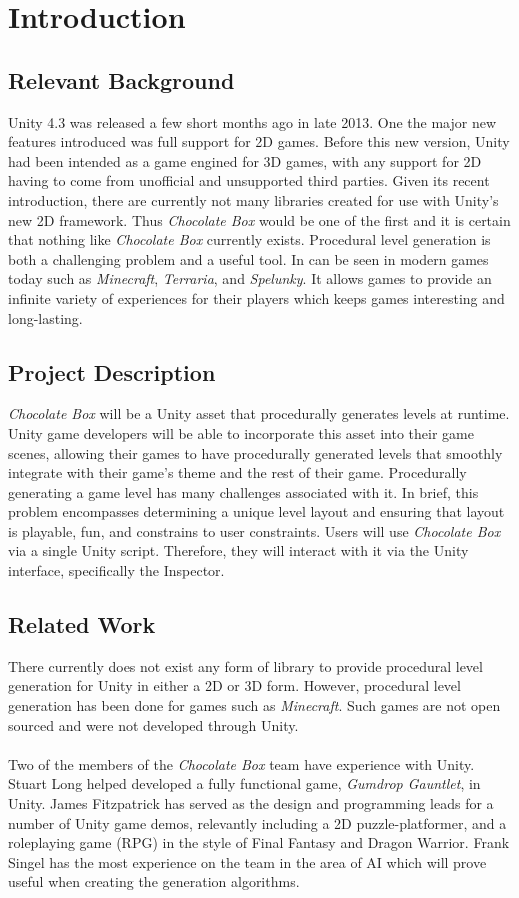 \documentclass[pdftex,12pt,letter]{article}
\begin{document}
\section{Introduction}
\subsection{Relevant Background}
Unity 4.3 was released a few short months ago in late 2013. One the major new features introduced was full support for 2D games. Before this new version, Unity had been intended as a game engined for 3D games, with any support for 2D having to come from unofficial and unsupported third parties. Given its recent introduction, there are currently not many libraries created for use with Unity's new 2D framework. Thus \textit{Chocolate Box} would be one of the first and it is certain that nothing like \textit{Chocolate Box} currently exists. Procedural level generation is both a challenging problem and a useful tool. In can be seen in modern games today such as \textit{Minecraft}, \textit{Terraria}, and \textit{Spelunky}. It allows games to provide an infinite variety of experiences for their players which keeps games interesting and long-lasting.
\subsection{Project Description}
\textit{Chocolate Box} will be a Unity asset that procedurally generates levels at runtime. Unity game developers will be able to incorporate this asset into their game scenes, allowing their games to have procedurally generated levels that smoothly integrate with their game's theme and the rest of their game. Procedurally generating a game level has many challenges associated with it. In brief, this problem encompasses determining a unique level layout and ensuring that layout is playable, fun, and constrains to user constraints. Users will use \textit{Chocolate Box} via a single Unity script. Therefore, they will interact with it via the Unity interface, specifically the Inspector.
\subsection{Related Work}
There currently does not exist any form of library to provide procedural level generation for Unity in either a 2D or 3D form. However, procedural level generation has been done for games such as \textit{Minecraft}. Such games are not open sourced and were not developed through Unity. 
\\\\
Two of the members of the \textit{Chocolate Box} team have experience with Unity. Stuart Long helped developed a fully functional game, \textit{Gumdrop Gauntlet}, in Unity. James Fitzpatrick has served as the design and programming leads for a number of Unity game demos, relevantly including a 2D puzzle-platformer, and a roleplaying game (RPG) in the style of Final Fantasy and Dragon Warrior. Frank Singel has the most experience on the team in the area of AI which will prove useful when creating the generation algorithms.
\end{document}
